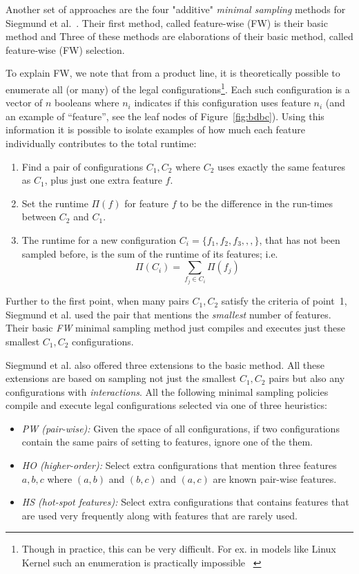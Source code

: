\documentclass{sig-alternative}
\newcommand{\bi}{\begin{itemize}}%
\newcommand{\ei}{\end{itemize}}
\newcommand{\be}{\begin{enumerate}}
\newcommand{\ee}{\end{enumerate}}
\newcommand{\fig}[1]{Figure~\ref{fig:#1}}
\begin{document}
Another set of approaches are the four "additive" {\em minimal sampling} methods for Siegmund et al.~\cite{siegmund2012predicting}.
Their first method, called feature-wise (FW) is their basic method and 
Three of these methods are    elaborations of their basic method, called feature-wise (FW)
selection.

To explain FW, we note that from a product line, it is theoretically possible to enumerate all (or many) of the legal configurations\footnote{Though in practice, this can be very difficult. For ex. in models like Linux Kernel such an enumeration is practically impossible ~\cite{sayyad13b}}. 
Each such
configuration is a vector of $n$ booleans where $n_i$ indicates if this configuration uses feature $n_i$ (and
an example of ``feature'', see the leaf nodes of \fig{bdbc}).
Using this information it  is possible to isolate examples of how much each feature individually contributes to the total runtime:
\be
\item Find a pair of  configurations $C_1,C_2$  where $C_2$ uses exactly the same features as $C_1$, plus just one  extra feature $f$.
\item Set the runtime $\Pi(f)$ for feature $f$ to be the difference in the run-times between $C_2$ and $C_1$.
\item The runtime  for a new configuration  $C_i=\{f_1,f_2,f_3,,,\}$, that has not been sampled before,  is the sum of the runtime of its features; i.e.
\begin{equation}
  \Pi(C_i) = \sum_{f_j \in C_i}\Pi(f_j)  
\end{equation}
\ee

Further to the first point, when many pairs $C_1,C_2$ satisfy the criteria of point~1, Siegmund et al. used the 
pair that mentions the {\em smallest} number of features. Their basic {\em FW} minimal sampling method 
just compiles and executes just these smallest $C_1,C_2$ configurations. 

Siegmund et al. also offered three extensions to the basic method. All these extensions are based on sampling
not just the smallest $C_1,C_2$  pairs but also any configurations with {\em interactions}. 
All the following minimal sampling policies compile and   execute legal configurations selected via one of three heuristics:
\bi
\item[{\em PW (pair-wise):}] Given the space of all configurations, if two configurations contain the same pairs of setting to features, 
ignore one of the them. 
\item[{\em HO (higher-order):}] Select extra configurations that 
mention three features $a,b,c$ where   $(a,b)$ and $(b,c)$ and $(a,c)$ are known pair-wise features.
\item[{\em HS (hot-spot features):}] Select extra configurations that contains features that are used very
frequently along with features that are rarely used. 
\ei
\end{document}
